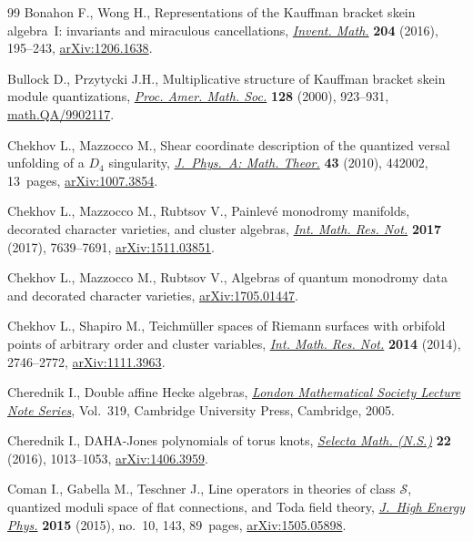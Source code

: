 \documentclass[10pt,a4paper]{amsart}
\numberwithin{equation}{section}
\begin{document}
\begin{thebibliography}{99}
Bonahon F., Wong H., Representations of the {K}auffman bracket skein
 algebra~{I}: invariants and miraculous cancellations, \href{https://doi.org/10.1007/s00222-015-0611-y}{\textit{Invent. Math.}}
 \textbf{204} (2016), 195--243, \href{https://arxiv.org/abs/1206.1638}{arXiv:1206.1638}.

Bullock D., Przytycki J.H., Multiplicative structure of {K}auffman bracket
 skein module quantizations, \href{https://doi.org/10.1090/S0002-9939-99-05043-1}{\textit{Proc. Amer. Math. Soc.}} \textbf{128}
 (2000), 923--931, \href{https://arxiv.org/abs/math.QA/9902117}{math.QA/9902117}.

Chekhov L., Mazzocco M., Shear coordinate description of the quantized versal
 unfolding of a {$D_4$} singularity, \href{https://doi.org/10.1088/1751-8113/43/44/442002}{\textit{J.~Phys.~A: Math. Theor.}}
 \textbf{43} (2010), 442002, 13~pages, \href{https://arxiv.org/abs/1007.3854}{arXiv:1007.3854}.

Chekhov L., Mazzocco M., Rubtsov V., Painlev\'{e} monodromy manifolds,
 decorated character varieties, and cluster algebras, \href{https://doi.org/10.1093/imrn/rnw219}{\textit{Int. Math. Res.
 Not.}} \textbf{2017} (2017), 7639--7691, \href{https://arxiv.org/abs/1511.03851}{arXiv:1511.03851}.

Chekhov L., Mazzocco M., Rubtsov V., Algebras of quantum monodromy data and
 decorated character varieties, \href{https://arxiv.org/abs/1705.01447}{arXiv:1705.01447}.

Chekhov L., Shapiro M., Teichm\"{u}ller spaces of {R}iemann surfaces with
 orbifold points of arbitrary order and cluster variables, \href{https://doi.org/10.1093/imrn/rnt016}{\textit{Int. Math.
 Res. Not.}} \textbf{2014} (2014), 2746--2772, \href{https://arxiv.org/abs/1111.3963}{arXiv:1111.3963}.

Cherednik I., Double affine {H}ecke algebras, \href{https://doi.org/10.1017/CBO9780511546501}{\textit{London Mathematical
 Society Lecture Note Series}}, Vol.~319, Cambridge University Press,
 Cambridge, 2005.

Cherednik I., D{AHA}-{J}ones polynomials of torus knots, \href{https://doi.org/10.1007/s00029-015-0210-1}{\textit{Selecta Math.
 (N.S.)}} \textbf{22} (2016), 1013--1053, \href{https://arxiv.org/abs/1406.3959}{arXiv:1406.3959}.

Coman I., Gabella M., Teschner J., Line operators in theories of class
 {$\mathcal S$}, quantized moduli space of flat connections, and {T}oda field
 theory, \href{https://doi.org/10.1007/JHEP10(2015)143}{\textit{J.~High Energy Phys.}} \textbf{2015} (2015), no.~10, 143,
 89~pages, \href{https://arxiv.org/abs/1505.05898}{arXiv:1505.05898}.


\end{thebibliography}
\end{document}
